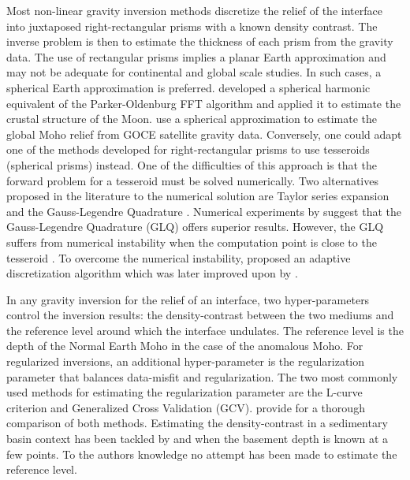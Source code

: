 Most non-linear gravity inversion methods discretize the relief of the
interface into juxtaposed right-rectangular prisms with a known density
contrast.
The inverse problem is then to estimate the thickness of each prism from the
gravity data.
The use of rectangular prisms implies a planar Earth approximation and may not
be adequate for continental and global scale studies.
In such cases, a spherical Earth approximation is preferred.
\citet{wieczorek1998} developed a spherical harmonic equivalent of the
Parker-Oldenburg FFT algorithm and applied it to estimate the crustal structure
of the Moon.
\citet{reguzzoni2013} use a spherical approximation to estimate the global
Moho relief from GOCE satellite gravity data.
Conversely, one could adapt one of the methods developed for
right-rectangular prisms to use tesseroids (spherical prisms) instead.
One of the difficulties of this approach is that the forward problem for a
tesseroid must be solved numerically.
Two alternatives proposed in the literature to the numerical solution are
Taylor series expansion \citep{heck2007, grombein2013}
and the Gauss-Legendre Quadrature
\citep{asgharzadeh2007}.
Numerical experiments by \citet{wild-pfeiffer2008} suggest that the
Gauss-Legendre Quadrature (GLQ) offers superior results.
However, the GLQ suffers from numerical instability when the computation point
is close to the tesseroid \citep{asgharzadeh2007}.
To overcome the numerical instability, \citet{li2011} proposed an adaptive
discretization algorithm which was later improved upon by \citet{uieda2016}.

In any gravity inversion for the relief of an interface, two hyper-parameters
control the inversion results: the density-contrast between the two mediums
and the reference level around which the interface undulates.
The reference level is the depth of the Normal Earth Moho in the case of the
anomalous Moho.
For regularized inversions, an additional hyper-parameter is the regularization
parameter that balances data-misfit and regularization.
The two most commonly used methods for estimating the regularization parameter
are the L-curve criterion and Generalized Cross Validation (GCV).
\citet{farquharson2004} provide for a thorough comparison of both methods.
Estimating the density-contrast in a sedimentary basin context has been tackled
by \citet{silva2006} and \citet{martins2010} when the basement depth is known
at a few points.
To the authors knowledge no attempt has been made to estimate the reference
level.

